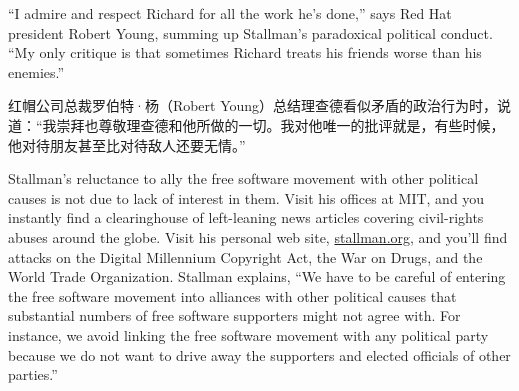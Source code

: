 \ifdefined\eng
``I admire and respect Richard for all the work he's done,'' says Red Hat president Robert Young, summing up Stallman's paradoxical political conduct. ``My only critique is that sometimes Richard treats his friends worse than his enemies.''
\fi

\ifdefined\chs
红帽公司总裁罗伯特·杨（Robert Young）总结理查德看似矛盾的政治行为时，说道：“我崇拜也尊敬理查德和他所做的一切。我对他唯一的批评就是，有些时候，他对待朋友甚至比对待敌人还要无情。”
\fi

\ifdefined{}
\fi

\ifdefined{}
\fi

\ifdefined\eng
Stallman's reluctance to ally the free software movement with other political causes is not due to lack of interest in them.  Visit his offices at MIT, and you instantly find a clearinghouse of left-leaning news articles covering civil-rights abuses around the globe. Visit his personal web site, \url{stallman.org}, and you'll find attacks on the Digital Millennium Copyright Act, the War on Drugs, and the World Trade Organization.  Stallman explains, ``We have to be careful of entering the free software movement into alliances with other political causes that substantial numbers of free software supporters might not agree with.  For instance, we avoid linking the free software movement with any political party because we do not want to drive away the supporters and elected officials of other parties.''
\fi

